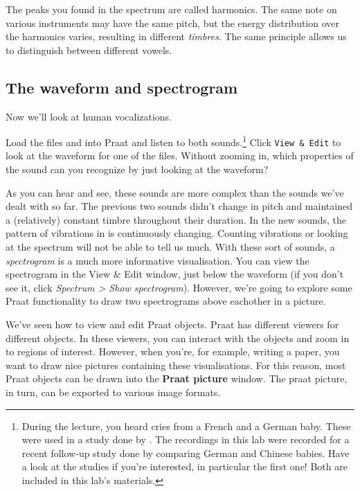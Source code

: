 \documentclass[a4paper, 9pt]{article}
\begin{document}
The peaks you found in the spectrum are called harmonics. The same note
on various instruments may have the same pitch, but the energy
distribution over the harmonics varies, resulting in different
\emph{timbres}. The same principle allows us to distinguish between
different vowels.


\subsection{The waveform and
spectrogram}\label{the-waveform-and-spectrogram}

Now we'll look at human vocalizations.

\begin{exercise}
\action Load the files  and  into Praat and listen to both sounds.\footnote{During the lecture, you heard cries from a French and a German baby. These were used in a study done by \cite{Mampe2009}. The recordings in this lab were recorded for a recent follow-up study done by \cite{Wermke2016} comparing German and Chinese babies. Have a look at the studies if you're interested, in particular the first one! Both are included in this lab's materials.}
\action Click \texttt{View \& Edit} to look at the waveform for one of the files. Without zooming in, which properties of the sound can you recognize by just looking at the waveform?
\end{exercise}

As you can hear and see, these sounds are more complex than the sounds
we've dealt with so far. The previous two sounds didn't change in pitch
and maintained a (relatively) constant timbre throughout their duration.
In the new sounds, the pattern of vibrations in is continuously
changing. Counting vibrations or looking at the spectrum will not be
able to tell us much. With these sort of sounds, a \emph{spectrogram} is
a much more informative visualisation. You can view the spectrogram in
the View \& Edit window, just below the waveform (if you don't see it, click \emph{Spectrum > Show spectrogram}). However, we're going
to explore some Praat functionality to draw two spectrograms above
eachother in a picture.

We've seen how to view and edit Praat objects. Praat has different
viewers for different objects. In these viewers, you can interact with
the objects and zoom in to regions of interest. However, when you're,
for example, writing a paper, you want to draw nice pictures containing
these visualisations. For this reason, most Praat objects can be drawn
into the \textbf{Praat picture} window. The praat picture, in turn, can
be exported to various image formats.
\end{document}
